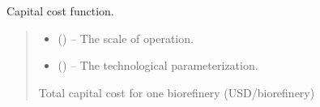 \documentclass[letterpaper,10pt,english]{sphinxmanual}
\begin{document}
\begin{fulllineitems}
\label{\detokenize{technology:technology.tutorial_biorefinery.capital_cost}}
\pysigstartsignatures
{}
\pysigstopsignatures
\sphinxAtStartPar
Capital cost function.
\begin{quote}\begin{description}
\begin{itemize}
\item {} 
\sphinxAtStartPar
{} () – The scale of operation.

\item {} 
\sphinxAtStartPar
{} () – The technological parameterization.

\end{itemize}

\sphinxAtStartPar
Total capital cost for one biorefinery (USD/biorefinery)

\end{description}\end{quote}

\end{fulllineitems}

\end{document}
